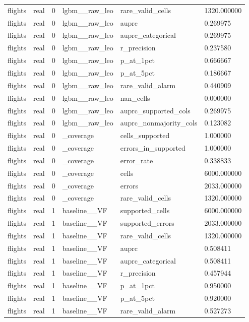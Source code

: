 \begin{tabular}{llllll}
flights & real & 0 & lgbm\_\_raw\_leo & rare\_valid\_cells & 1320.000000 \\
flights & real & 0 & lgbm\_\_raw\_leo & auprc & 0.269975 \\
flights & real & 0 & lgbm\_\_raw\_leo & auprc\_categorical & 0.269975 \\
flights & real & 0 & lgbm\_\_raw\_leo & r\_precision & 0.237580 \\
flights & real & 0 & lgbm\_\_raw\_leo & p\_at\_1pct & 0.666667 \\
flights & real & 0 & lgbm\_\_raw\_leo & p\_at\_5pct & 0.186667 \\
flights & real & 0 & lgbm\_\_raw\_leo & rare\_valid\_alarm & 0.440909 \\
flights & real & 0 & lgbm\_\_raw\_leo & nan\_cells & 0.000000 \\
flights & real & 0 & lgbm\_\_raw\_leo & auprc\_supported\_cols & 0.269975 \\
flights & real & 0 & lgbm\_\_raw\_leo & auprc\_nonmajority\_cols & 0.123082 \\
flights & real & 0 & \_coverage & cells\_supported & 1.000000 \\
flights & real & 0 & \_coverage & errors\_in\_supported & 1.000000 \\
flights & real & 0 & \_coverage & error\_rate & 0.338833 \\
flights & real & 0 & \_coverage & cells & 6000.000000 \\
flights & real & 0 & \_coverage & errors & 2033.000000 \\
flights & real & 0 & \_coverage & rare\_valid\_cells & 1320.000000 \\
flights & real & 1 & baseline\_\_VF & supported\_cells & 6000.000000 \\
flights & real & 1 & baseline\_\_VF & supported\_errors & 2033.000000 \\
flights & real & 1 & baseline\_\_VF & rare\_valid\_cells & 1320.000000 \\
flights & real & 1 & baseline\_\_VF & auprc & 0.508411 \\
flights & real & 1 & baseline\_\_VF & auprc\_categorical & 0.508411 \\
flights & real & 1 & baseline\_\_VF & r\_precision & 0.457944 \\
flights & real & 1 & baseline\_\_VF & p\_at\_1pct & 0.950000 \\
flights & real & 1 & baseline\_\_VF & p\_at\_5pct & 0.920000 \\
flights & real & 1 & baseline\_\_VF & rare\_valid\_alarm & 0.527273 \\

\end{tabular}
